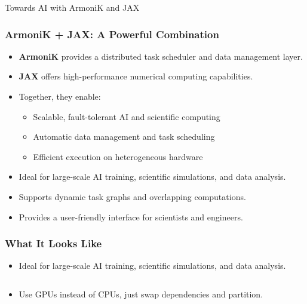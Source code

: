 \documentclass[10pt,aspectratio=1609]{beamer}
\begin{document}
\begin{section}{Towards AI with ArmoniK and JAX}
 \begin{frame}
   \frametitle{ArmoniK + JAX: A Powerful Combination}
   \begin{itemize}
     \item \textbf{ArmoniK} provides a distributed task scheduler and data management layer.
     \item \textbf{JAX} offers high-performance numerical computing capabilities.
     \item Together, they enable:
           \begin{itemize}
             \item Scalable, fault-tolerant AI and scientific computing
             \item Automatic data management and task scheduling
             \item Efficient execution on heterogeneous hardware
           \end{itemize}
     \item Ideal for large-scale AI training, scientific simulations, and data analysis.
     \item Supports dynamic task graphs and overlapping computations.
     \item Provides a user-friendly interface for scientists and engineers.
   \end{itemize}
 \end{frame}

 \begin{frame}
   \frametitle{What It Looks Like}
   \begin{itemize}
     \item Ideal for large-scale AI training, scientific simulations, and data analysis.
           \inputminted[breaklines,frame=single,fontsize=\small]{python}{cholesky_simple.py}
     \item Use GPUs instead of CPUs, just swap dependencies and partition.
           \inputminted[breaklines,frame=single,fontsize=\small]{python}{cholesky_simple_gpu.py}
   \end{itemize}
 \end{frame}
\end{section}
\end{document}
